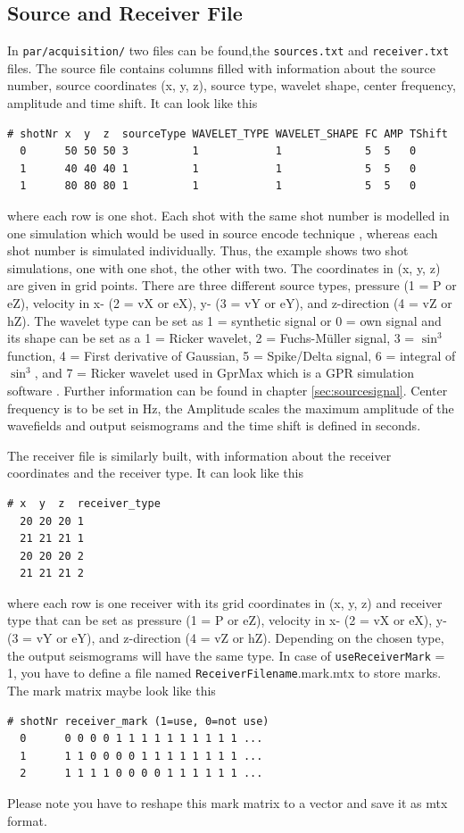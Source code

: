 \documentclass[pdftex,a4paper,parskip,listof=totoc,bibliography=totoc,onehalfspacing,12pt]{scrreprt}
\newcommand{\shellcmd}[1]{\indent\indent\texttt{#1}}	%
\begin{document}
\subsection{Source and Receiver File}\label{sec:sourcesandreceiver}
In \shellcmd{par/acquisition/} two files can be found,the \shellcmd{sources.txt} and \shellcmd{receiver.txt} files.
The source file contains columns filled with information about the source number, source coordinates (x, y, z), source type, wavelet shape, center frequency, amplitude and time shift. It can look like this
\begin{verbatim}
# shotNr x  y  z  sourceType WAVELET_TYPE WAVELET_SHAPE FC AMP TShift
  0      50 50 50 3          1            1             5  5   0
  1      40 40 40 1          1            1             5  5   0
  1      80 80 80 1          1            1             5  5   0
\end{verbatim}
where each row is one shot. Each shot with the same shot number is modelled in one simulation which would be used in source encode technique \citep{krebs2009fast}, whereas each shot number is simulated individually. Thus, the example shows two shot simulations, one with one shot, the other with two.
The coordinates in (x, y, z) are given in grid points. There are three different source types, pressure (1 = P or eZ), velocity in x- (2 = vX or eX), y- (3 = vY or eY), and z-direction (4 = vZ or hZ). 
The wavelet type can be set as 1 = synthetic signal or 0 = own signal and its shape can be set as a 1 = Ricker wavelet, 2 = Fuchs-M\"uller signal, 3 = $\sin^3$ function, 4 = First derivative of Gaussian, 5 = Spike/Delta signal, 6 = integral of $\sin^3$, and 7 = Ricker wavelet used in GprMax which is a GPR simulation software  \citep{giannopoulos2005modelling}. 
Further information can be found in chapter \ref{sec:sourcesignal}.
Center frequency is to be set in Hz, the Amplitude scales the maximum amplitude of the wavefields and output seismograms and the time shift is defined in seconds.

The receiver file is similarly built, with information about the receiver coordinates and the receiver type. It can look like this 
\begin{verbatim}
# x  y  z  receiver_type
  20 20 20 1
  21 21 21 1
  20 20 20 2
  21 21 21 2
\end{verbatim}
where each row is one receiver with its grid coordinates in (x, y, z) and receiver type that can be set as pressure (1 = P or eZ), velocity in x- (2 = vX or eX), y- (3 = vY or eY), and z-direction (4 = vZ or hZ). Depending on the chosen type, the output seismograms will have the same type. In case of \verb+useReceiverMark+ = 1, you have to define a file named \verb+ReceiverFilename+.mark.mtx to store marks. The mark matrix maybe look like this
\begin{verbatim}
# shotNr receiver_mark (1=use, 0=not use)
  0      0 0 0 0 1 1 1 1 1 1 1 1 1 1 ...
  1      1 1 0 0 0 0 1 1 1 1 1 1 1 1 ...
  2      1 1 1 1 0 0 0 0 1 1 1 1 1 1 ...
\end{verbatim}
Please note you have to reshape this mark matrix to a vector and save it as mtx format.
\end{document}
